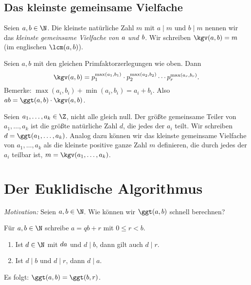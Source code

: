 \subsection*{Das kleinste gemeinsame Vielfache}

\begin{defn*}
	Seien $a,b \in \N$. Die kleinste natürliche Zahl $m$ mit $a \mid m$ und $b \mid m$ nennen wir das \emph{kleinste gemeinsame Vielfache von $\emph{a}$ und $\emph{b}$}. Wir schreiben $\kgv(a,b) = m$ (im englischen $\lcm(a,b)$).
\end{defn*}

\begin{rem*}
	Seien $a,b$ mit den gleichen Primfaktorzerlegungen wie oben. Dann
	\[ \kgv(a,b) = p_1^{\max(a_1,b_1)} \cdot p_2^{\max(a_2,b_2)} \dotsm p_r^{\max(a_r,b_r)}. \]
	Bemerke: $\max(a_i,b_i) + \min(a_i,b_i) = a_i + b_i$. Also $ab = \ggt(a,b) \cdot \kgv(a,b)$.
\end{rem*}

\begin{defn*}
	Seien \( a_1,\dotsc,a_k \in \Z \), nicht alle gleich null. Der größte gemeinsame Teiler von \( a_1,\dotsc,a_k \) ist die größte natürliche Zahl $d$, die jedes der $a_i$ teilt. Wir schreiben \( d = \ggt(a_1,\dotsc,a_k) \). Analog dazu können wir das kleinste gemeinsame Vielfache von $a_1,\dotsc, a_k$ als die kleinste positive ganze Zahl $m$ definieren, die durch jedes der $a_i$ teilbar ist, $m = \kgv(a_1,\dotsc,a_k)$.
\end{defn*}

\section{Der Euklidische Algorithmus}

\emph{Motivation:} Seien $a,b \in \N$. Wie können wir $\ggt(a,b)$ schnell berechnen?

\begin{rem*}
	Für $a,b \in \N$ schreibe $a = qb + r$ mit $0 \leq r < b$.
	\begin{enumerate}[label={\roman*})]
		\item Ist $d \in \N$ mit $d \mit a$ und $d \mid b$, dann gilt auch $d \mid r$.
		\item Ist $d \mid b$ und $d \mid r$, dann $d \mid a$.
	\end{enumerate}
	Es folgt: $\ggt(a,b) = \ggt(b,r)$.
\end{rem*}

